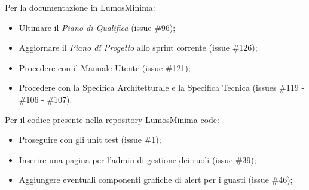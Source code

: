 \documentclass[a4paper, 12pt]{article}
\begin{document}
Per la documentazione in LumosMinima:
\begin{itemize}
    \item Ultimare il \textit{Piano di Qualifica} (issue \#96);
    \item Aggiornare il \textit{Piano di Progetto} allo sprint corrente (issue \#126);
    \item Procedere con il Manuale Utente (issue \#121);
    \item Procedere con la Specifica Architetturale e la Specifica Tecnica (issues \#119 - \#106 - \#107).
\end{itemize}
\vspace*{0.5cm}
Per il codice presente nella repository LumosMinima-code:
\begin{itemize}
    \item Proseguire con gli unit test (issue \#1);
    \item Inserire una pagina per l'admin di gestione dei ruoli (issue \#39);
    \item Aggiungere eventuali componenti grafiche di alert per i guasti (issue \#46);
\end{itemize}
\end{document}
